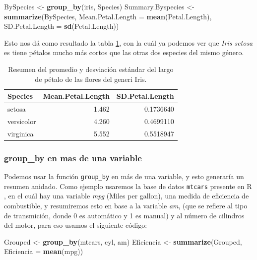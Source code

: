 \documentclass[]{book}
\newenvironment{Shaded}{\begin{snugshade}}{\end{snugshade}}
\newcommand{\DataTypeTok}[1]{\textcolor[rgb]{0.13,0.29,0.53}{#1}}
\newcommand{\KeywordTok}[1]{\textcolor[rgb]{0.13,0.29,0.53}{\textbf{#1}}}
\newcommand{\NormalTok}[1]{#1}
\newcommand{\StringTok}[1]{\textcolor[rgb]{0.31,0.60,0.02}{#1}}
\begin{document}
\begin{Shaded}
\begin{Highlighting}[]
\NormalTok{BySpecies <-}\StringTok{ }\KeywordTok{group_by}\NormalTok{(iris, Species)}
\NormalTok{Summary.Byspecies <-}\StringTok{ }\KeywordTok{summarize}\NormalTok{(BySpecies, }\DataTypeTok{Mean.Petal.Length =} \KeywordTok{mean}\NormalTok{(Petal.Length), }
    \DataTypeTok{SD.Petal.Length =} \KeywordTok{sd}\NormalTok{(Petal.Length))}
\end{Highlighting}
\end{Shaded}

Esto nos dá como resultado la tabla \ref{tab:SummaryBySpecies}, con la
cuál ya podemos ver que \emph{Iris setosa} es tiene pétalos mucho más
cortos que las otras dos especies del mismo género.

\begin{table}

\caption{\label{tab:SummaryBySpecies}Resumen del promedio y desviación estándar del largo de pétalo de las flores del generi Iris.}
\centering
\begin{tabular}[t]{lrr}
\toprule
Species & Mean.Petal.Length & SD.Petal.Length\\
\midrule
setosa & 1.462 & 0.1736640\\
versicolor & 4.260 & 0.4699110\\
virginica & 5.552 & 0.5518947\\
\bottomrule
\end{tabular}
\end{table}

\hypertarget{group_by-en-mas-de-una-variable}{%
\subsubsection{group\_by en mas de una
variable}\label{group_by-en-mas-de-una-variable}}

Podemos usar la función \texttt{group\_by} en más de una variable, y
esto generaría un resumen anidado. Como ejemplo usaremos la base de
datos \texttt{mtcars} presente en R \citep{henderson1981building}, en el
cuál hay una variable \emph{mpg} (Miles per gallon), una medida de
eficiencia de combustible, y resumiremos esto en base a la variable
\emph{am}, (que se refiere al tipo de transmición, donde 0 es automático
y 1 es manual) y al número de cilindros del motor, para eso usamos el
siguiente código:

\begin{Shaded}
\begin{Highlighting}[]
\NormalTok{Grouped <-}\StringTok{ }\KeywordTok{group_by}\NormalTok{(mtcars, cyl, am)}
\NormalTok{Eficiencia <-}\StringTok{ }\KeywordTok{summarize}\NormalTok{(Grouped, }\DataTypeTok{Eficiencia =} \KeywordTok{mean}\NormalTok{(mpg))}
\end{Highlighting}
\end{Shaded}
\end{document}
